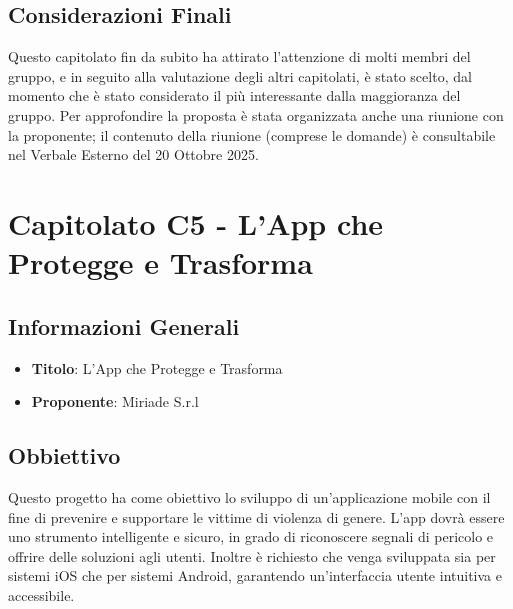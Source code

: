 \documentclass[a4paper,12pt]{article}
\begin{document}
    \subsection{Considerazioni Finali}
    Questo capitolato fin da subito ha attirato l'attenzione di molti membri del gruppo, e in seguito alla valutazione degli altri capitolati, è stato scelto, dal momento che è stato considerato il più interessante dalla maggioranza del gruppo. Per approfondire la proposta è stata organizzata anche una riunione con la proponente; il contenuto della riunione (comprese le domande) è consultabile nel Verbale Esterno del 20 Ottobre 2025.

    \section{Capitolato C5 - L’App che Protegge e Trasforma}
    \subsection{Informazioni Generali}
        \begin{itemize}
            \item \textbf{Titolo}: L’App che Protegge e Trasforma
            \item \textbf{Proponente}: Miriade S.r.l
        \end{itemize}
    \subsection{Obbiettivo}
    Questo progetto ha come obiettivo lo sviluppo di un’applicazione mobile con il fine di prevenire e supportare le vittime di violenza di genere. L’app dovrà essere uno strumento intelligente e sicuro, in grado di riconoscere segnali di pericolo e offrire delle soluzioni agli utenti. Inoltre è richiesto che venga sviluppata sia per sistemi iOS che per sistemi Android, garantendo un’interfaccia utente intuitiva e accessibile.
\end{document}
